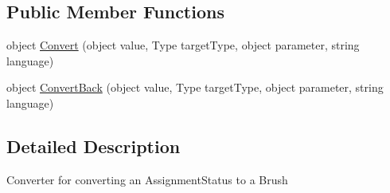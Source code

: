\subsection*{Public Member Functions}
\begin{DoxyCompactItemize}
\item 
object \hyperlink{class_field_service_1_1_win_r_t_1_1_utilities_1_1_status_to_color_converter_a3c4bb9425988c6c2589921670246b682}{Convert} (object value, Type target\+Type, object parameter, string language)
\item 
object \hyperlink{class_field_service_1_1_win_r_t_1_1_utilities_1_1_status_to_color_converter_a24bdeaf215ceaed50852fec28814924e}{Convert\+Back} (object value, Type target\+Type, object parameter, string language)
\end{DoxyCompactItemize}


\subsection{Detailed Description}
Converter for converting an Assignment\+Status to a Brush 



